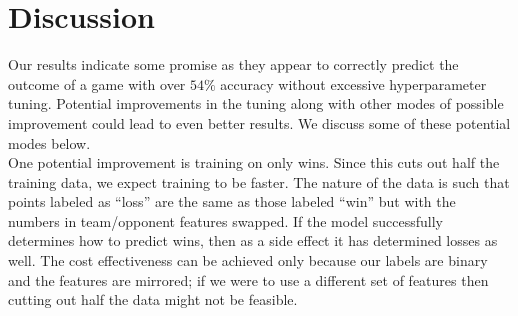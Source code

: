 \documentclass[10pt,twocolumn,letterpaper]{article}
\begin{document}




\section{Discussion}

Our results indicate some promise as they appear to correctly predict the outcome of a game with over $54\%$ accuracy without excessive hyperparameter tuning. Potential improvements in the tuning along with other modes of possible improvement could lead to even better results. We discuss some of these potential modes below. \\

One potential improvement is training on only wins. Since this cuts out half the training data, we expect training to be faster. The nature of the data is such that points labeled as ``loss'' are the same as those labeled ``win'' but with the numbers in team/opponent features swapped. If the model successfully determines how to predict wins, then as a side effect it has determined losses as well. The cost effectiveness can be achieved only because our labels are binary and the features are mirrored; if we were to use a different set of features then cutting out half the data might not be feasible. \\

\end{document}
